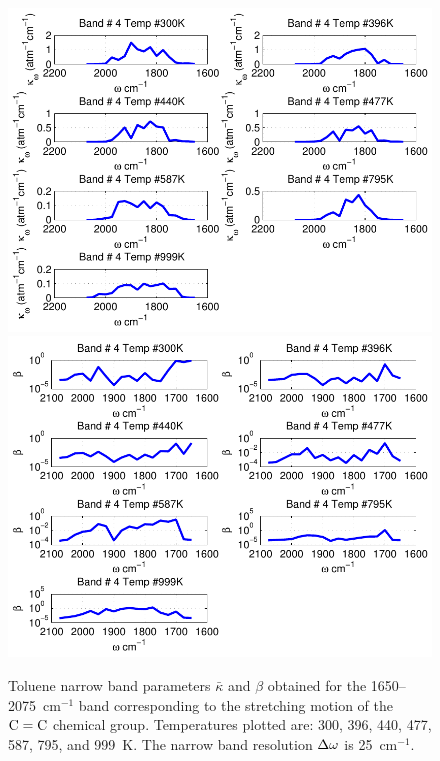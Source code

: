 \begin{figure}[p]
\begin{center}
\includegraphics[width=5.0in]{Figures/Toluene_Kappa_Band4_MALKMUS.pdf}
\includegraphics[width=5.0in]{Figures/Toluene_Beta_Band4_MALKMUS.pdf}
\end{center}
\caption{Toluene narrow band parameters $\bar{\kappa}$ and $\beta$ obtained for the 1650--2075~cm$^{-1}$ band corresponding to the stretching motion of the $\rm C=C$ chemical group. Temperatures plotted are: 300, 396, 440, 477, 587, 795, and 999~K. The narrow band resolution $\Delta \omega$ is 25~cm$^{-1}$.\label{fig:toluene_kappa_beta4}}
\end{figure}


